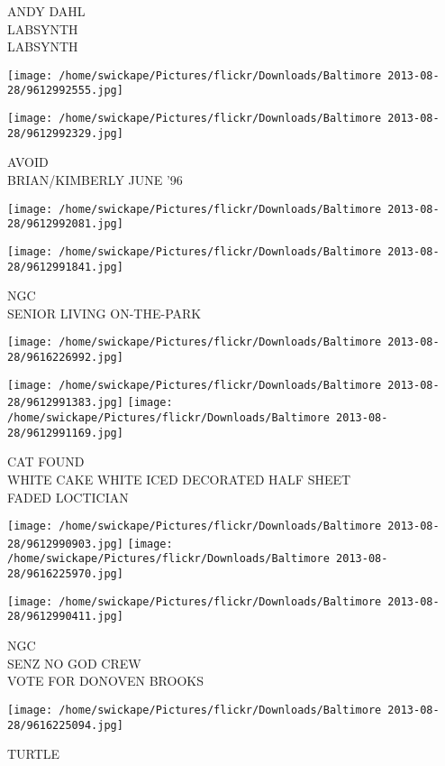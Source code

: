 \documentclass[10pt,letterpaper]{article}
\begin{document}
ANDY DAHL\\
LABSYNTH\\
LABSYNTH
\pagebreak

\texttt{[image: /home/swickape/Pictures/flickr/Downloads/Baltimore 2013-08-28/9612992555.jpg]}

\vspace{0.25in}
\texttt{[image: /home/swickape/Pictures/flickr/Downloads/Baltimore 2013-08-28/9612992329.jpg]}

AVOID\\
BRIAN/KIMBERLY JUNE '96
\pagebreak

\texttt{[image: /home/swickape/Pictures/flickr/Downloads/Baltimore 2013-08-28/9612992081.jpg]}

\vspace{0.25in}
\texttt{[image: /home/swickape/Pictures/flickr/Downloads/Baltimore 2013-08-28/9612991841.jpg]}

NGC\\
SENIOR LIVING ON{-}THE{-}PARK
\pagebreak

\texttt{[image: /home/swickape/Pictures/flickr/Downloads/Baltimore 2013-08-28/9616226992.jpg]}

\vspace{0.25in}
\texttt{[image: /home/swickape/Pictures/flickr/Downloads/Baltimore 2013-08-28/9612991383.jpg]}
\texttt{[image: /home/swickape/Pictures/flickr/Downloads/Baltimore 2013-08-28/9612991169.jpg]}

CAT FOUND\\
WHITE CAKE WHITE ICED DECORATED HALF SHEET\\
FADED LOCTICIAN
\pagebreak

\texttt{[image: /home/swickape/Pictures/flickr/Downloads/Baltimore 2013-08-28/9612990903.jpg]}
\texttt{[image: /home/swickape/Pictures/flickr/Downloads/Baltimore 2013-08-28/9616225970.jpg]}

\vspace{0.25in}
\texttt{[image: /home/swickape/Pictures/flickr/Downloads/Baltimore 2013-08-28/9612990411.jpg]}

NGC\\
SENZ NO GOD CREW\\
VOTE FOR DONOVEN BROOKS
\pagebreak

\texttt{[image: /home/swickape/Pictures/flickr/Downloads/Baltimore 2013-08-28/9616225094.jpg]}

TURTLE
\pagebreak
\end{document}
